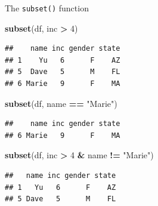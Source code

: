 \documentclass[ignorenonframetext,]{beamer}
\newenvironment{Shaded}{\begin{snugshade}}{\end{snugshade}}
\newcommand{\DecValTok}[1]{\textcolor[rgb]{0.00,0.00,0.81}{#1}}
\newcommand{\KeywordTok}[1]{\textcolor[rgb]{0.13,0.29,0.53}{\textbf{#1}}}
\newcommand{\NormalTok}[1]{#1}
\newcommand{\OperatorTok}[1]{\textcolor[rgb]{0.81,0.36,0.00}{\textbf{#1}}}
\newcommand{\StringTok}[1]{\textcolor[rgb]{0.31,0.60,0.02}{#1}}
\begin{document}
\begin{frame}[fragile]{The \texttt{subset()} function}
\protect\hypertarget{the-subset-function-2}{}

\begin{Shaded}
\begin{Highlighting}[]
\KeywordTok{subset}\NormalTok{(df, inc }\OperatorTok{>}\StringTok{ }\DecValTok{4}\NormalTok{)}
\end{Highlighting}
\end{Shaded}

\begin{verbatim}
##    name inc gender state
## 1    Yu   6      F    AZ
## 5  Dave   5      M    FL
## 6 Marie   9      F    MA
\end{verbatim}

\begin{Shaded}
\begin{Highlighting}[]
\KeywordTok{subset}\NormalTok{(df, name }\OperatorTok{==}\StringTok{ "Marie"}\NormalTok{)}
\end{Highlighting}
\end{Shaded}

\begin{verbatim}
##    name inc gender state
## 6 Marie   9      F    MA
\end{verbatim}

\begin{Shaded}
\begin{Highlighting}[]
\KeywordTok{subset}\NormalTok{(df, inc }\OperatorTok{>}\StringTok{ }\DecValTok{4} \OperatorTok{&}\StringTok{ }\NormalTok{name }\OperatorTok{!=}\StringTok{ "Marie"}\NormalTok{)}
\end{Highlighting}
\end{Shaded}

\begin{verbatim}
##   name inc gender state
## 1   Yu   6      F    AZ
## 5 Dave   5      M    FL
\end{verbatim}

\end{frame}
\end{document}
